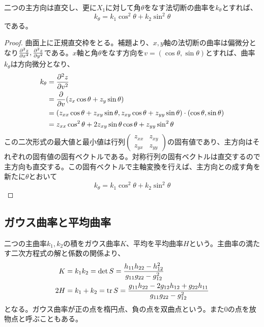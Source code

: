         \begin{thm}
            二つの主方向は直交し、更に$X_1$に対して角$\theta$をなす法切断の曲率を$k_\theta$とすれば、
                \[k_\theta = k_1\cos^2\theta + k_2\sin^2\theta\]
            である。
        \end{thm}
        \begin{proof}
            曲面上に正規直交枠をとる。補題より、$x,y$軸の法切断の曲率は偏微分となり$\pd[^2z]{x^2},\pd[^2z]{y^2}$である。$x$軸と角$\theta$をなす方向を$v = (\cos\theta, \sin\theta)$とすれば、曲率$k_\theta$は方向微分となり、
            \begin{align*}
                k_\theta &= \pd[^2z]{v^2}\\
                &= \pd{v}(z_x\cos\theta + z_y\sin\theta)\\
                &= (z_{xx}\cos\theta + z_{xy}\sin\theta, z_{xy}\cos\theta + z_{yy}\sin\theta) \cdot (\cos\theta, \sin\theta)\\
                &= z_{xx}\cos^2\theta + 2z_{xy}\sin\theta\cos\theta + z_{yy}\sin^2\theta
            \end{align*}
            この二次形式の最大値と最小値は行列$\begin{pmatrix}z_{xx} & z_{xy}\\ z_{yx} & z_{yy}\end{pmatrix}$の固有値であり、主方向はそれぞれの固有値の固有ベクトルである。対称行列の固有ベクトルは直交するので主方向も直交する。この固有ベクトルで主軸変換を行えば、主方向との成す角を新たに$\theta$とおいて
                \[k_\theta = k_1\cos^2\theta + k_2\sin^2\theta\]
        \end{proof}

    \subsection{ガウス曲率と平均曲率}
        二つの主曲率$k_1,k_2$の積をガウス曲率$K$、平均を平均曲率$H$という。主曲率の満たす二次方程式の解と係数の関係より、
        \begin{align*}
            K &= k_1k_2 = \det S = \frac{h_{11}h_{22} - h_{12}^2}{g_{11}g_{22} - g_{12}^2}\\
            2H &= k_1 + k_2 = \tr S = \frac{g_{11}h_{22} - 2g_{12}h_{12} + g_{22}h_{11}}{g_{11}g_{22} - g_{12}^2}\\
        \end{align*}
        となる。ガウス曲率が正の点を楕円点、負の点を双曲点という。また0の点を放物点と呼ぶこともある。